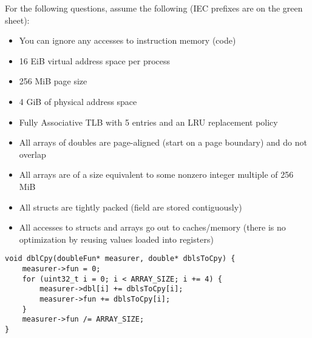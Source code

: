 \begin{blocksection}

\question
For the following questions, assume the following (IEC prefixes are on the green sheet):
\begin{itemize}
\item You can ignore any accesses to instruction memory (code)
\item 16 EiB virtual address space per process
\item 256 MiB page size
\item 4 GiB of physical address space
\item Fully Associative TLB with 5 entries and an LRU replacement policy
\item All arrays of doubles are page-aligned (start on a page boundary) and do not overlap
\item All arrays are of a size equivalent to some nonzero integer multiple of 256 MiB
\item All structs are tightly packed (field are stored contiguously)
\item All accesses to structs and arrays go out to caches/memory (there is no optimization by reusing values loaded into registers)
\end{itemize}

\begin{verbatim}
void dblCpy(doubleFun* measurer, double* dblsToCpy) {
    measurer->fun = 0;
    for (uint32_t i = 0; i < ARRAY_SIZE; i += 4) {
        measurer->dbl[i] += dblsToCpy[i];
        measurer->fun += dblsToCpy[i];
    }
    measurer->fun /= ARRAY_SIZE;
}
\end{verbatim}


\end{blocksection}